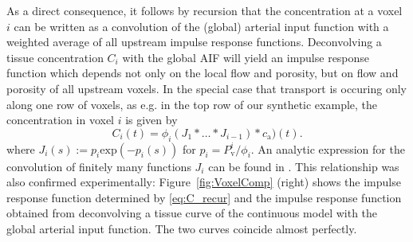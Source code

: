 \documentclass[journal,twocolumn]{IEEEtran}
\newcommand{\ca}{c_\mathrm{a}}
\newcommand{\Perfv}{P_{\mathrm{v}}}
\begin{document}
	As a direct consequence, it follows by recursion that the concentration at a voxel $i$ can be written as a convolution of the (global) arterial input function with a weighted average of all upstream impulse response functions.
	Deconvolving a tissue concentration $C_i$ with the global AIF will yield an impulse response function which depends not only on the local flow and porosity, but on flow and porosity of all upstream voxels.
	In the special case that transport is occuring only along one row of voxels, as e.g. in the top row of our synthetic example, the concentration in voxel $i$ is given by
	\begin{equation}
		C_i(t) = \phi_i (J_1\ast \dots \ast J_{i-1})*\ca)(t).
		\label{eq:C_recur}
	\end{equation}
	where $J_i(s):=p_i\mathrm{exp}(- p_i(s))$ for $p_i=\Perfv^i/\phi_i$.
	An analytic expression for the convolution of finitely many functions $J_i$ can be found in \cite{Kordecki97}.
	This relationship was also confirmed experimentally: Figure~\ref{fig:VoxelComp} (right) shows the impulse response function determined by \eqref{eq:C_recur} and the impulse response function obtained from deconvolving a tissue curve of the continuous model with the global arterial input function.
	The two curves coincide almost perfectly.
	
\end{document}
